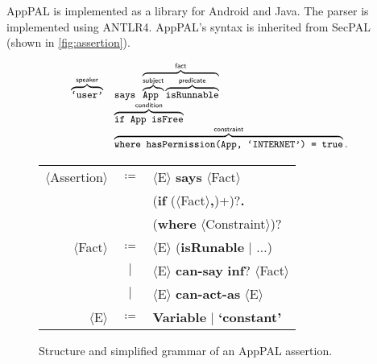 \documentclass[thesis.tex]{subfiles}
\begin{document}
AppPAL is implemented as a library for Android and Java.
The parser is implemented using ANTLR4.
AppPAL's syntax is inherited from SecPAL~\cite{becker_secpal:_2010} (shown in \autoref{fig:assertion}).

\begin{figure*}
  \newcommand{\bracetext}[1]{\text{\sffamily #1}}
  \newcommand{\smalltext}[1]{\text{\ttfamily\small #1}}
  \centering
  \begin{minipage}{0.49\linewidth}
    \begin{equation*}\small
      \begin{array}{r l}\footnotesize
        \overbrace{\smalltext{`user'}}^{\bracetext{speaker}} &
        \smalltext{ says }\overbrace{\overbrace{\smalltext{ App }}^{\bracetext{subject}}\overbrace{\smalltext{ isRunnable}}^{\bracetext{predicate}}}^{\bracetext{fact}} \\
        & \overbrace{\smalltext{ if App isFree}}^{\bracetext{condition}} \\
        & \overbrace{\smalltext{ where hasPermission(App, `INTERNET') = true}}^{\bracetext{constraint}}.
      \end{array}
    \end{equation*}
  \end{minipage}
  \begin{minipage}{0.49\linewidth}
  \newcommand{\nonterminal}[1]{$\langle$#1$\rangle$}
  \newcommand{\terminal}[1]{\textbf{#1}}
  \begin{tabular}{r c l}
    \footnotesize
    \nonterminal{Assertion} & $\coloneqq$ & \nonterminal{E} \terminal{says} \nonterminal{Fact} \\
                            &             & \hspace{1em}(\terminal{if} (\nonterminal{Fact}\terminal{,})+)?\terminal{.} \\
                            &             & \hspace{1em}(\terminal{where} \nonterminal{Constraint})? \\
    \nonterminal{Fact}      & $\coloneqq$ & \nonterminal{E} (\terminal{isRunable} $\vert$ $\ldots$) \\
                            & $\vert$     & \nonterminal{E} \terminal{can-say} \terminal{inf}? \nonterminal{Fact} \\
                            & $\vert$     & \nonterminal{E} \terminal{can-act-as} \nonterminal{E} \\
    \nonterminal{E}         & $\coloneqq$ & \terminal{Variable} $\vert$ \terminal{`constant'}
  \end{tabular}
  \vspace{2em}
  \end{minipage}
  \caption{Structure and simplified grammar of an AppPAL assertion.}
  \label{fig:assertion}
\end{figure*}
\end{document}
